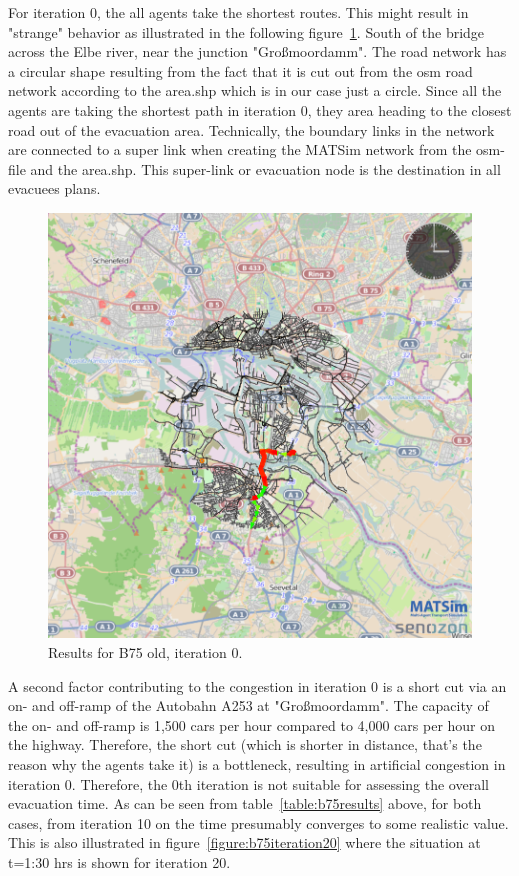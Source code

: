 For iteration 0, the all agents take the shortest routes. This might result in "strange" behavior as illustrated in the following figure~\ref{fig:B75iteration0}.
South of the bridge across the Elbe river, near the junction "Gro{\ss}moordamm". The road network has a circular shape resulting from the fact that it is cut out from the osm road network according to the area.shp which is in our case just a circle. Since all the agents are taking the shortest path in iteration 0, they area heading to the closest road out of the evacuation area. Technically, the boundary links in the network are connected to a super link when creating the MATSim network from the osm-file and the area.shp. This super-link or evacuation node is the destination in all evacuees plans. 

\begin{figure}[th!]
\centering
\includegraphics[width=0.7\linewidth]{extending/figures/Evacuation/b75iteration0}
\caption[Results for B75 old, iteration 0.]{Results for B75 old, iteration 0.}
\label{fig:B75iteration0}
\end{figure}

A second factor contributing to the congestion in iteration 0 is a short cut via an on- and off-ramp of the Autobahn A253 at "Gro{\ss}moordamm". The capacity of the on- and off-ramp is 1,500 cars per hour compared to 4,000 cars per hour on the highway. Therefore, the short cut (which is shorter in distance, that's the reason why the agents take it) is a bottleneck, resulting in artificial congestion in iteration 0.
Therefore, the 0th iteration is not suitable for assessing the overall evacuation time. As can be seen from table~\ref{table:b75results} above, for both cases, from iteration 10 on the time presumably converges to some realistic value. This is also illustrated in figure~\ref{figure:b75iteration20} where the situation at t=1:30 hrs is shown for iteration 20.

